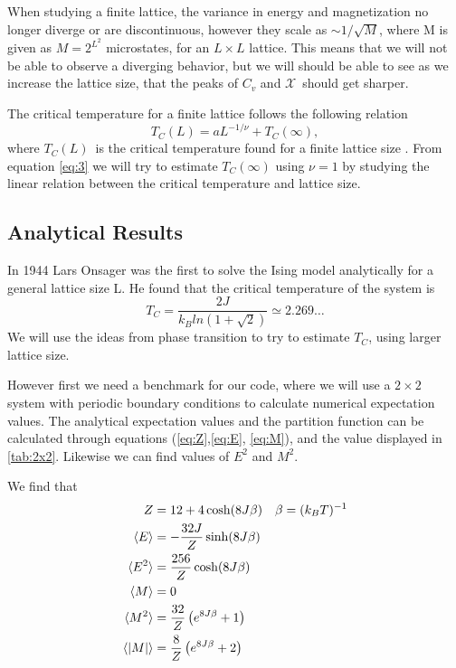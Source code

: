 \documentclass[%
reprint,
nofootinbib,
amsmath,amssymb,
aps,
]{revtex4-1}
\begin{document}
When studying a finite lattice, the variance in energy and magnetization no longer diverge or are discontinuous, however they scale as $\sim 1/\sqrt{M}$, where M is given as $M = 2^{L^2}$ microstates, for an $L\times L$ lattice. This means that we will not be able to observe a diverging behavior, but we will should be able to see as we increase the lattice size, that the peaks of $C_v$ and $\mathcal{X}$ should get sharper. 

The critical temperature for a finite lattice follows the following relation 
\begin{equation}\label{eq:3}
	T_C(L) = aL^{-1/\nu} + T_C(\infty),
\end{equation}
where $T_C(L)$ is the critical temperature found for a finite lattice size . From equation \eqref{eq:3} we will try to estimate $T_C(\infty)$ using $\nu = 1$ by studying the linear relation between the critical temperature and lattice size. 


\subsection{Analytical Results} %
In 1944 Lars Onsager was the first to solve the Ising model analytically for a general lattice size L\cite{LarsOnsager}. He found that the critical temperature of the system is 
\begin{equation}
	T_C = \frac{2J}{k_Bln(1+\sqrt{2})}\simeq 2.269\dots
\end{equation} 
We will use the ideas from phase transition to try to estimate $T_C$, using larger lattice size. 

However first we need a benchmark for our code, where we will use a $2\times 2$ system with periodic boundary conditions to calculate numerical expectation values. The analytical expectation values and the partition function can be calculated through equations (\ref{eq:Z},\ref{eq:E}, \ref{eq:M}), and the value displayed in \autoref{tab:2x2}. Likewise we can find values of $E^2$ and $M^2$. 

We find that 
\begin{align}
	Z &= 12 + 4\cosh(8J\beta) && \beta = (k_BT)^{-1}\\
	\langle E\rangle &= -\frac{32J}{Z}\sinh(8J\beta)\\
	\langle E^2\rangle &= \frac{256}{Z}\cosh(8J\beta)\\
	\langle M\rangle &= 0\\
	\langle M^2\rangle &=\frac{32}{Z}\left(e^{8J\beta} + 1\right)\\
	\langle \abs{M}\rangle &= \frac{8}{Z}\left(e^{8J\beta} + 2\right)
\end{align}
\end{document}
